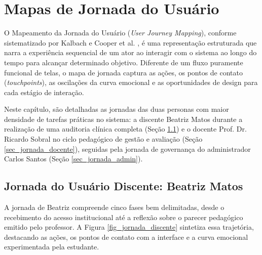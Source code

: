 \chapter{Mapas de Jornada do Usuário}
\label{cap_jornadas_usuario}

O Mapeamento da Jornada do Usuário (\textit{User Journey Mapping}), conforme sistematizado por Kalbach \cite{kalbach2020} e Cooper et al. \cite{cooper2014}, é uma representação estruturada que narra a experiência sequencial de um ator ao interagir com o sistema ao longo do tempo para alcançar determinado objetivo. Diferente de um fluxo puramente funcional de telas, o mapa de jornada captura as ações, os pontos de contato (\textit{touchpoints}), as oscilações da curva emocional e as oportunidades de design para cada estágio de interação.

Neste capítulo, são detalhadas as jornadas das duas personas com maior densidade de tarefas práticas no sistema: a discente Beatriz Matos durante a realização de uma auditoria clínica completa (Seção \ref{sec_jornada_discente}) e o docente Prof. Dr. Ricardo Sobral no ciclo pedagógico de gestão e avaliação (Seção \ref{sec_jornada_docente}), seguidas pela jornada de governança do administrador Carlos Santos (Seção \ref{sec_jornada_admin}).

\section{Jornada do Usuário Discente: Beatriz Matos}
\label{sec_jornada_discente}

A jornada de Beatriz compreende cinco fases bem delimitadas, desde o recebimento do acesso institucional até a reflexão sobre o parecer pedagógico emitido pelo professor. A Figura \ref{fig_jornada_discente} sintetiza essa trajetória, destacando as ações, os pontos de contato com a interface e a curva emocional experimentada pela estudante.

